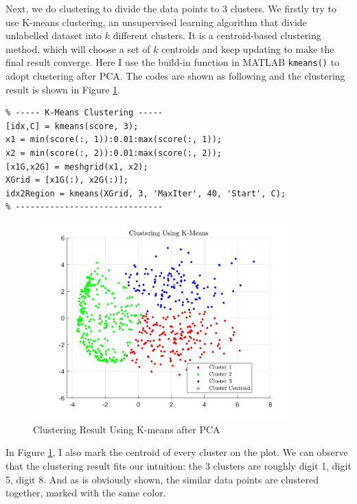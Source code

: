 \documentclass[a4paper,12pt]{article} %
\begin{document}
\hspace{0.7cm}
Next, we do clustering to divide the data points to 3 clusters. We firstly try to use K-means clustering, an unsupervised learning algorithm that divide unlabelled dataset into $k$ different clusters. It is a centroid-based clustering method, which will choose a set of $k$ centroids and keep updating to make the final result converge. Here I use the build-in function in MATLAB \texttt{kmeans()} to adopt clustering after PCA. The codes are shown as following and the clustering result is shown in Figure \ref{fig:2}.

\begin{footnotesize}
\begin{verbatim}
% ----- K-Means Clustering -----
[idx,C] = kmeans(score, 3);
x1 = min(score(:, 1)):0.01:max(score(:, 1));
x2 = min(score(:, 2)):0.01:max(score(:, 2));
[x1G,x2G] = meshgrid(x1, x2);
XGrid = [x1G(:), x2G(:)];
idx2Region = kmeans(XGrid, 3, 'MaxIter', 40, 'Start', C);
% ------------------------------
\end{verbatim}
\end{footnotesize}

\begin{figure}[!htbp]
	\centering
	\includegraphics[width=0.9\textwidth]{KMEANS.jpg}
	\caption{Clustering Result Using K-means after PCA}
	\label{fig:2}
\end{figure}


\hspace{0.7cm}
In Figure \ref{fig:2}, I also mark the centroid of every cluster on the plot. We can observe that the clustering result fits our intuition: the 3 clusters are roughly digit 1, digit 5, digit 8. And as is obviously shown, the similar data points are clustered together, marked with the same color.
\end{document}

